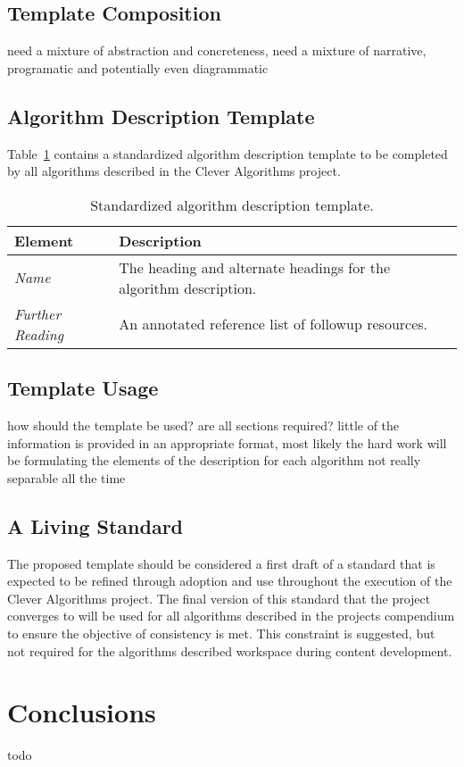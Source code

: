 \documentclass[a4paper, 11pt]{article}
\begin{document}
\subsection{Template Composition}
need a mixture of abstraction and concreteness, need a mixture of narrative, programatic and potentially even diagrammatic 

\subsection{Algorithm Description Template}
Table~\ref{tab:template} contains a standardized algorithm description template to be completed by all algorithms described in the Clever Algorithms project.

\begin{table}[ht]
	\centering
		\begin{tabularx}{\textwidth}{lX}
		\toprule
		\textbf{Element} & \textbf{Description} \\ 
		\toprule
		\emph{Name} & The heading and alternate headings for the algorithm description.  \\ 
		\midrule
		\emph{Further Reading} & An annotated reference list of followup resources. \\
		\bottomrule
		\end{tabularx}	
	\caption{Standardized algorithm description template.}
	\label{tab:template}
\end{table}

\subsection{Template Usage}
how should the template be used? are all sections required? little of the information is provided in an appropriate format, most likely the hard work will be formulating the elements of the description for each algorithm
not really separable all the time

\subsection{A Living Standard}
The proposed template should be considered a first draft of a standard that is expected to be refined through adoption and use throughout the execution of the Clever Algorithms project. The final version of this standard that the project converges to will be used for all algorithms described in the projects compendium to ensure the objective of consistency is met. This constraint is suggested, but not required for the algorithms described workspace during content development.

\section{Conclusions}
\label{sec:conclusions}
todo



\end{document}
